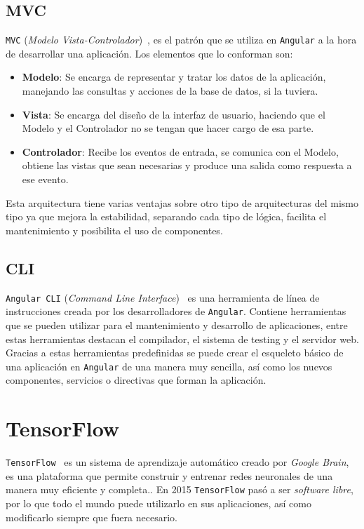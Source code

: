 \documentclass[a4paper, 12pt]{book}
\begin{document}
\subsection{MVC}
\label{subsec:mvc}

\texttt{MVC} (\textit{Modelo Vista-Controlador})~\cite{mvc}, es el patrón que se utiliza en \texttt{Angular} a la hora de desarrollar una aplicación. Los elementos que lo conforman son:

\begin{itemize}
	\item \textbf{Modelo}: Se encarga de representar y tratar los datos de la aplicación, manejando las consultas y acciones de la base de datos, si la tuviera. 
	\item \textbf{Vista}: Se encarga del diseño de la interfaz de usuario, haciendo que el Modelo y el Controlador no se tengan que hacer cargo de esa parte.
	\item \textbf{Controlador}: Recibe los eventos de entrada, se comunica con el Modelo, obtiene las vistas que sean necesarias y produce una salida como respuesta a ese evento.
\end{itemize}

Esta arquitectura tiene varias ventajas sobre otro tipo de arquitecturas del mismo tipo ya que mejora la estabilidad, separando cada tipo de lógica, facilita el mantenimiento y posibilita el uso de componentes.

\subsection{CLI}
\label{subsec:cli}

\texttt{Angular CLI} (\textit{Command Line Interface})~\cite{angularcli} es una herramienta de línea de instrucciones creada por los desarrolladores de \texttt{Angular}. Contiene herramientas que se pueden utilizar para el mantenimiento y desarrollo de aplicaciones, entre estas herramientas destacan el compilador, el sistema de testing y el servidor web. Gracias a estas herramientas predefinidas se puede crear el esqueleto básico de una aplicación en \texttt{Angular} de una manera muy sencilla, así como los nuevos componentes, servicios o directivas que forman la aplicación.

\section{TensorFlow}
\label{sec:tensorflow}

\texttt{TensorFlow}~\cite{tensorflow} es un sistema de aprendizaje automático creado por \textit{Google Brain}, es una plataforma que permite construir y entrenar redes neuronales de una manera muy eficiente y completa.. En 2015 \texttt{TensorFlow} pasó a ser \textit{software libre}, por lo que todo el mundo puede utilizarlo en sus aplicaciones, así como modificarlo siempre que fuera necesario.
\end{document}
